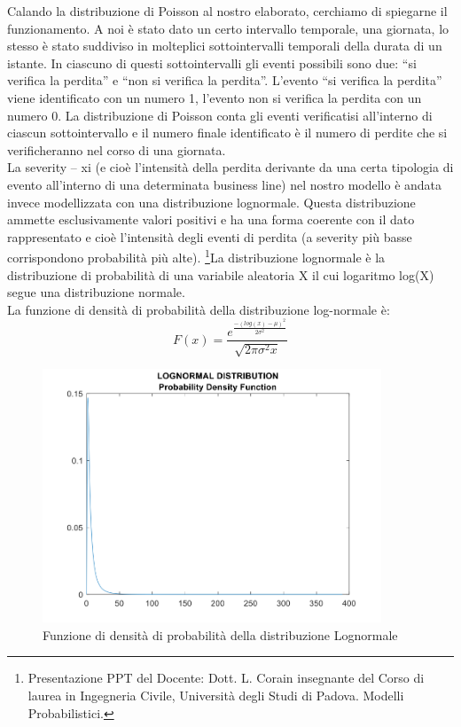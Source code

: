 \documentclass[titlepage]{article}
\begin{document}
\begin{itemize}
Calando la distribuzione di Poisson al nostro elaborato, cerchiamo di spiegarne il funzionamento. A noi è stato dato un certo intervallo temporale, una giornata, lo stesso è stato suddiviso in molteplici sottointervalli temporali della durata di un istante. In ciascuno di questi sottointervalli gli eventi possibili sono due: “si verifica la perdita” e “non si verifica la perdita”. L’evento “si verifica la perdita” viene identificato con un numero 1, l’evento non si verifica la perdita con un numero 0. La distribuzione di Poisson conta gli eventi verificatisi all’interno di ciascun sottointervallo e il numero finale identificato è il numero di perdite che si verificheranno nel corso di una giornata.
\\
La severity – xi (e cioè l’intensità della perdita derivante da una certa tipologia di evento all’interno di una determinata business line) nel nostro modello è andata invece modellizzata con una distribuzione lognormale. Questa distribuzione ammette esclusivamente valori positivi e ha una forma coerente con il dato rappresentato e cioè l’intensità degli eventi di perdita (a severity più basse corrispondono probabilità più alte).  \footnote{Presentazione PPT del Docente: Dott. L. Corain insegnante del Corso di laurea in Ingegneria Civile, Università degli Studi di Padova. Modelli Probabilistici.}La distribuzione lognormale è la distribuzione di probabilità di una variabile aleatoria X il cui logaritmo log(X) segue una distribuzione normale.\\
La funzione di densità di probabilità della distribuzione log-normale è:\\

\begin{equation}\label{key}
F(x)=
\frac{e^{\frac{-(log(x)-\mu)^2}{2\sigma^2}}}{\sqrt{2\pi\sigma^2x}}

\end{equation}

\begin{figure}[htbp]
	\includegraphics[width=0.9\textwidth]{pdflognormal.png}
	\caption{\label{fig:poissdistr.png}Funzione di densità di probabilità della distribuzione Lognormale}
\end{figure}


\end{itemize}
\end{document}
